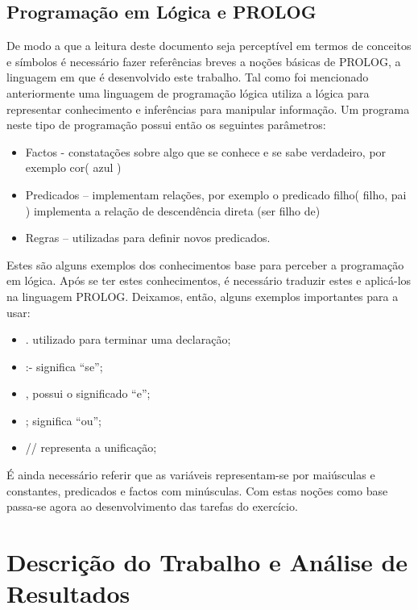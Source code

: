 \section{Programação em Lógica e PROLOG}
\label{p2:proglogprolog}
De modo a que a leitura deste documento seja perceptível em termos de conceitos e símbolos é necessário fazer referências breves a noções básicas de PROLOG, a linguagem em que é desenvolvido este trabalho.
Tal como foi mencionado anteriormente uma linguagem de programação lógica utiliza a lógica para representar conhecimento e inferências para manipular informação. Um programa neste tipo de programação possui então os seguintes parâmetros:

\begin{itemize}
	\item Factos - constatações sobre algo que se conhece e se sabe verdadeiro, por exemplo cor( azul )
	\item Predicados – implementam relações, por exemplo o predicado filho( filho, pai ) implementa a relação de descendência direta (ser filho de)
	\item Regras – utilizadas para definir novos predicados. 
\end{itemize}

Estes são alguns exemplos dos conhecimentos base para perceber a programação em lógica.
Após se ter estes conhecimentos, é necessário traduzir estes e aplicá-los na linguagem PROLOG.
Deixamos, então, alguns exemplos importantes para a usar:

\begin{itemize}
	\item .  utilizado para terminar uma declaração;
	\item :-  significa “se”;
	\item ,  possui o significado “e”;
	\item ;  significa “ou”;
	\item //  representa a unificação;
\end{itemize}

É ainda necessário referir que as variáveis representam-se por maiúsculas e constantes, predicados e factos com minúsculas.
Com estas noções como base passa-se agora ao desenvolvimento das tarefas do exercício.



\chapter{Descrição do Trabalho e Análise de Resultados}
\label{cap:p3}

